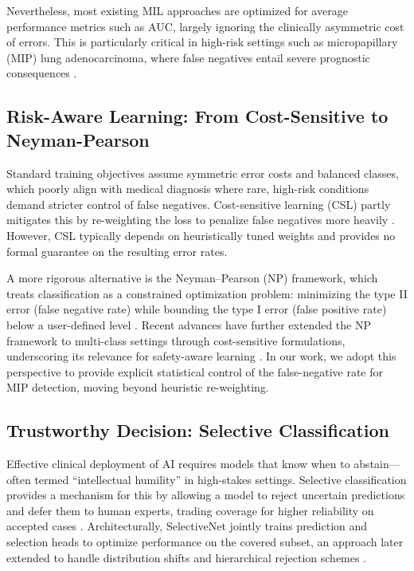 \documentclass[sigconf,review,anonymous]{acmart}
\theoremstyle{remark}
\begin{document}
Nevertheless, most existing MIL approaches are optimized for average performance metrics such as AUC, largely ignoring the clinically asymmetric cost of errors. This is particularly critical in high-risk settings such as micropapillary (MIP) lung adenocarcinoma, where false negatives entail severe prognostic consequences \cite{caso2020underlying, dai2017tumor}.

\subsection{Risk-Aware Learning: From Cost-Sensitive to Neyman-Pearson}

Standard training objectives assume symmetric error costs and balanced classes, which poorly align with medical diagnosis where rare, high-risk conditions demand stricter control of false negatives. Cost-sensitive learning (CSL) partly mitigates this by re-weighting the loss to penalize false negatives more heavily \cite{el2010foundations,he2009learning}. However, CSL typically depends on heuristically tuned weights and provides no formal guarantee on the resulting error rates.

A more rigorous alternative is the Neyman–Pearson (NP) framework, which treats classification as a constrained optimization problem: minimizing the type II error (false negative rate) while bounding the type I error (false positive rate) below a user-defined level \cite{rigollet2011neyman,tong2018neyman}. Recent advances have further extended the NP framework to multi-class settings through cost-sensitive formulations, underscoring its relevance for safety-aware learning \cite{tian2025neyman}. In our work, we adopt this perspective to provide explicit statistical control of the false-negative rate for MIP detection, moving beyond heuristic re-weighting.

\subsection{Trustworthy Decision: Selective Classification}

Effective clinical deployment of AI requires models that know when to abstain—often termed “intellectual humility” in high-stakes settings. Selective classification provides a mechanism for this by allowing a model to reject uncertain predictions and defer them to human experts, trading coverage for higher reliability on accepted cases \cite{hendrycks2016baseline, leibig2022combining}. Architecturally, SelectiveNet \cite{geifman2019selectivenet, geifman2017selective} jointly trains prediction and selection heads to optimize performance on the covered subset, an approach later extended to handle distribution shifts and hierarchical rejection schemes \cite{goren2024hierarchical}.
\end{document}
